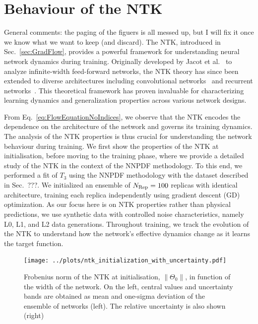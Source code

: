 \section{Behaviour of the NTK}
\label{sec:NTKPheno}

\ac{General comments: the paging of the figuers is all messed up, but I will fix
it once we know what we want to keep (and discard).} The NTK, introduced in
Sec.~\ref{sec:GradFlow}, provides a powerful framework for understanding neural
network dynamics during training. Originally developed by Jacot et
al.~\cite{jacot2018neural} to analyze infinite-width feed-forward networks, the
NTK theory has since been extended to diverse architectures including
convolutional networks~\cite{arora2019exact} and recurrent
networks~\cite{alemohammad2021recurrent}. This theoretical framework has proven
invaluable for characterizing learning dynamics and generalization properties
across various network designs.

From Eq.~\eqref{eq:FlowEquationNoIndices}, we observe that the NTK encodes the
dependence on the architecture of the network and governs its training dynamics.
The analysis of the NTK properties is thus crucial for understanding the network
behaviour during training. We first show the properties of the NTK at
initialisation, before moving to the training phase, where we provide a detailed
study of the NTK in the context of the NNPDF methodology. To this end, we
performed a fit of $T_3$ using the NNPDF methodology with the dataset described
in Sec.~???. We initialized an ensemble of $N_{\rm Rep} = 100$ replicas with
identical architecture, training each replica independently using gradient
descent (GD) optimization. As our focus here is on NTK properties rather than
physical predictions, we use synthetic data with controlled noise
characteristics, namely L0, L1, and L2 data generations. Throughout training, we
track the evolution of the NTK to understand how the network's effective
dynamics change as it learns the target function.

\begin{figure}[t!]
  \centering
  \texttt{[image: ../plots/ntk\_initialization\_with\_uncertainty.pdf]}
  \caption{Frobenius norm of the NTK at initialisation, $\lVert \Theta_0
  \rVert$, in function of the width of the network. On the left, central values
  and uncertainty bands are obtained as mean and one-sigma deviation of the
  ensemble of networks (left). The relative uncertainty is also shown (right)}
  \label{fig:NTKInit}
\end{figure}

